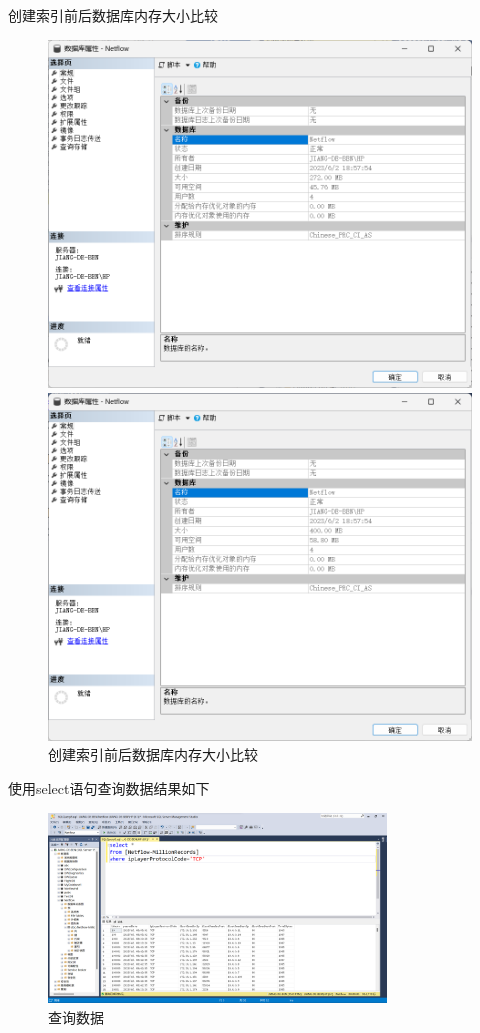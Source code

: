 \documentclass[UTF8,12pt]{article}
\begin{document}
创建索引前后数据库内存大小比较
\begin{figure}[htbp]
	\centering
	\begin{minipage}{0.49\linewidth}
		\centering
		\includegraphics[width=0.9\linewidth]{img/11.png}
	\end{minipage}
	\begin{minipage}{0.49\linewidth}
		\centering
		\includegraphics[width=0.9\linewidth]{img/12.png}
	\end{minipage}
    \caption{创建索引前后数据库内存大小比较}
\end{figure}

使用select语句查询数据结果如下
\begin{figure}[htbp]
    \centering
    \includegraphics[width=0.8\textwidth]{img/13.png}
    \caption{查询数据}
\end{figure}
\end{document}
